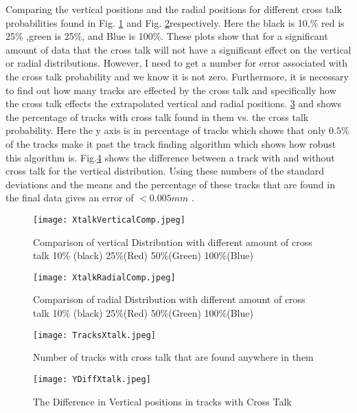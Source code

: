 \documentclass[./Thesis]{subfiles}
\begin{document}
	Comparing the vertical positions and the radial positions for different cross talk probabilities found in Fig. \ref{fig:XtalkVerticalComp} and Fig. \ref{fig:XtalkRadialComp}respectively. Here the black is 10,\% red is 25\% ,green is 25\%, and Blue is 100\%. These plots show that for a significant amount of data that the cross talk will not have a significant effect on the vertical or radial distributions. However, I need to get a number for error associated with the cross talk probability and we know it is not zero. Furthermore, it is necessary to find out how many tracks are effected by the cross talk and specifically how the cross talk effects the extrapolated vertical and radial positions. \ref{fig:tracksXtalk} and shows the percentage of tracks with cross talk found in them vs. the cross talk probability. Here the y axis is in percentage of tracks which shows that only $0.5\%$ of the tracks make it past the track finding algorithm which shows how robust this algorithm is. Fig.\ref{fig:YDiffXtalk} shows the difference between a track with and without cross talk for the vertical distribution. Using these numbers of the standard deviations and the means and the percentage of these tracks that are found in the final data gives an error of $<0.005 mm$ .


\begin{figure}
	\centerline{\texttt{[image: XtalkVerticalComp.jpeg]}}
	\caption[ Comparison of the Vertical Distribution]{ Comparison of vertical Distribution with different amount of cross talk 10\% (black) 25\%(Red) 50\%(Green) 100\%(Blue)}
	\label{fig:XtalkVerticalComp}
\end{figure}



\begin{figure}
	\centerline{\texttt{[image: XtalkRadialComp.jpeg]}}
	\caption[ Comparison of the Radial Distribution]{ Comparison of radial Distribution with different amount of cross talk 10\% (black) 25\%(Red) 50\%(Green) 100\%(Blue)}
	\label{fig:XtalkRadialComp}
\end{figure}


\begin{figure}
	\centerline{\texttt{[image: TracksXtalk.jpeg]}}
	\caption[Tracks with Xtalk]{ Number of tracks with cross talk that are found anywhere in them}
	\label{fig:tracksXtalk}
\end{figure}


\begin{figure}
	\centerline{\texttt{[image: YDiffXtalk.jpeg]}}
	\caption[Difference in Y with Xtalk]{ The Difference in Vertical positions in tracks with Cross Talk}
	\label{fig:YDiffXtalk}
\end{figure}
\end{document}
